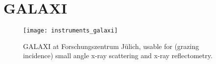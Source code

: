 \documentclass[\main/dresen_thesis.tex]{subfiles}
\begin{document}
\section{GALAXI}\label{ch:appendix:lss:galaxi}
\begin{figure}[h]
  \centering
  \texttt{[image: instruments\_galaxi]}
  \caption{\label{fig:appendix:lss:galaxi}GALAXI at Forschungszentrum J\"ulich, usable for (grazing incidence) small angle x-ray scattering and x-ray reflectometry.}
\end{figure}
\end{document}
